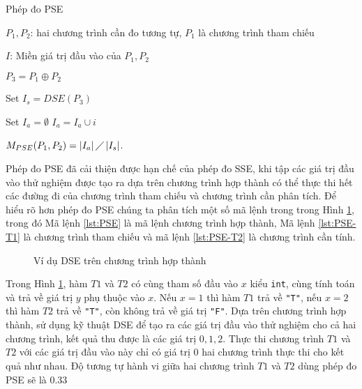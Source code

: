  \begin{algorithm}[h]
   \caption{Phép đo PSE}
   \label{alg:pse}
   \begin{algorithmic}
   \item $P_{1}, P_{2}$: hai chương trình cần đo tương tự, $P_1$ là
     chương trình tham chiếu
   \item $I$: Miền giá trị đầu vào của $P_{1}, P_{2}$
   \item $P_{3} = P_1 \oplus P_2$
   \item Set $I_{s} = DSE(P_{3})$ 
   \item Set $I_{a} = \emptyset$ 
     	\State $I_{a} = I_{a} \cup i$ 
     	\EndIf 
     	\EndFor
   \item
     $M_{PSE}(P_{1}, P_{2}) = \left|I_{a}\right| \diagup
     \left|I_{s}\right| $.
   \end{algorithmic}
 \end{algorithm}

Phép đo PSE đã cải thiện được hạn chế của phép đo
 SSE, khi tập các giá trị đầu vào thử nghiệm được tạo ra dựa trên 
 chương trình hợp thành có thể thực thi hết các đường đi của chương 
 trình tham chiếu và chương trình cần phân tích. Để hiểu rõ hơn phép đo PSE chúng ta phân tích một số mã lệnh trong trong Hình \ref{fig:PSE}, trong đó Mã lệnh \ref{lst:PSE} là mã lệnh chương trình hợp thành, Mã lệnh \ref{lst:PSE-T1} là chương trình tham chiếu và mã lệnh \ref{lst:PSE-T2} là chương trình cần tính.

 \begin{figure}[h]
	\centering
	\caption{Ví dụ DSE trên chương trình hợp thành}
	\label{fig:PSE}
	\begin{minipage}[t]{0.3\linewidth}
		
	\end{minipage}%
	\hfill\vrule\hfill
	\begin{minipage}[t]{0.3\linewidth}
		
	\end{minipage}%
	\hfill\vrule\hfill
	\begin{minipage}[t]{0.3\linewidth}
		
	\end{minipage}%
\end{figure}

Trong Hình \ref{fig:PSE}, hàm $ T1 $ và $ T2 $ có cùng tham số đầu vào $ x $ kiểu \texttt{int}, cùng tính toán và trả về giá trị $ y $ phụ thuộc vào $ x $. Nếu $ x = 1$ thì hàm $ T1 $ trả về \texttt{"T"}, nếu $ x = 2$ thì hàm $ T2 $ trả về \texttt{"T"}, còn không trả về giá trị \texttt{"F"}. Dựa trên chương trình hợp thành, sử dụng kỹ thuật DSE để tạo ra các giá trị đầu vào thử nghiệm cho cả hai chương trình, kết quả thu được là các giá trị $ 0, 1, 2 $. Thực thi chương trình $ T1 $ và $ T2 $ với các giá trị đầu vào này chỉ có giá trị $ 0 $ hai chương trình thực thi cho kết quả như nhau. Độ tương tự hành vi giữa hai chương trình $ T1 $ và $ T2 $ dùng phép đo PSE sẽ là $ 0.33 $
 

